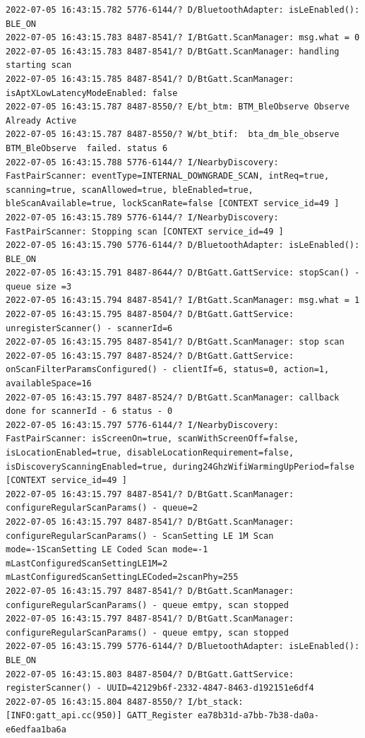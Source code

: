 \documentclass[a4paper,12pt]{book}
\begin{document}
\begin{lstlisting}
2022-07-05 16:43:15.782 5776-6144/? D/BluetoothAdapter: isLeEnabled(): BLE_ON
2022-07-05 16:43:15.783 8487-8541/? I/BtGatt.ScanManager: msg.what = 0
2022-07-05 16:43:15.783 8487-8541/? D/BtGatt.ScanManager: handling starting scan
2022-07-05 16:43:15.785 8487-8541/? D/BtGatt.ScanManager: isAptXLowLatencyModeEnabled: false
2022-07-05 16:43:15.787 8487-8550/? E/bt_btm: BTM_BleObserve Observe Already Active
2022-07-05 16:43:15.787 8487-8550/? W/bt_btif:  bta_dm_ble_observe BTM_BleObserve  failed. status 6
2022-07-05 16:43:15.788 5776-6144/? I/NearbyDiscovery: FastPairScanner: eventType=INTERNAL_DOWNGRADE_SCAN, intReq=true, scanning=true, scanAllowed=true, bleEnabled=true, bleScanAvailable=true, lockScanRate=false [CONTEXT service_id=49 ]
2022-07-05 16:43:15.789 5776-6144/? I/NearbyDiscovery: FastPairScanner: Stopping scan [CONTEXT service_id=49 ]
2022-07-05 16:43:15.790 5776-6144/? D/BluetoothAdapter: isLeEnabled(): BLE_ON
2022-07-05 16:43:15.791 8487-8644/? D/BtGatt.GattService: stopScan() - queue size =3
2022-07-05 16:43:15.794 8487-8541/? I/BtGatt.ScanManager: msg.what = 1
2022-07-05 16:43:15.795 8487-8504/? D/BtGatt.GattService: unregisterScanner() - scannerId=6
2022-07-05 16:43:15.795 8487-8541/? D/BtGatt.ScanManager: stop scan
2022-07-05 16:43:15.797 8487-8524/? D/BtGatt.GattService: onScanFilterParamsConfigured() - clientIf=6, status=0, action=1, availableSpace=16
2022-07-05 16:43:15.797 8487-8524/? D/BtGatt.ScanManager: callback done for scannerId - 6 status - 0
2022-07-05 16:43:15.797 5776-6144/? I/NearbyDiscovery: FastPairScanner: isScreenOn=true, scanWithScreenOff=false, isLocationEnabled=true, disableLocationRequirement=false, isDiscoveryScanningEnabled=true, during24GhzWifiWarmingUpPeriod=false [CONTEXT service_id=49 ]
2022-07-05 16:43:15.797 8487-8541/? D/BtGatt.ScanManager: configureRegularScanParams() - queue=2
2022-07-05 16:43:15.797 8487-8541/? D/BtGatt.ScanManager: configureRegularScanParams() - ScanSetting LE 1M Scan mode=-1ScanSetting LE Coded Scan mode=-1 mLastConfiguredScanSettingLE1M=2 mLastConfiguredScanSettingLECoded=2scanPhy=255
2022-07-05 16:43:15.797 8487-8541/? D/BtGatt.ScanManager: configureRegularScanParams() - queue emtpy, scan stopped
2022-07-05 16:43:15.797 8487-8541/? D/BtGatt.ScanManager: configureRegularScanParams() - queue emtpy, scan stopped
2022-07-05 16:43:15.799 5776-6144/? D/BluetoothAdapter: isLeEnabled(): BLE_ON
2022-07-05 16:43:15.803 8487-8504/? D/BtGatt.GattService: registerScanner() - UUID=42129b6f-2332-4847-8463-d192151e6df4
2022-07-05 16:43:15.804 8487-8550/? I/bt_stack: [INFO:gatt_api.cc(950)] GATT_Register ea78b31d-a7bb-7b38-da0a-e6edfaa1ba6a

\end{lstlisting}
\end{document}
